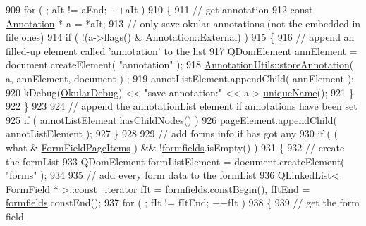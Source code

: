 \begin{DoxyCode}
909         \textcolor{keywordflow}{for} ( ; aIt != aEnd; ++aIt )
910         \{
911             \textcolor{comment}{// get annotation}
912             \textcolor{keyword}{const} \hyperlink{classOkular_1_1Annotation}{Annotation} * a = *aIt;
913             \textcolor{comment}{// only save okular annotations (not the embedded in file ones)}
914             \textcolor{keywordflow}{if} ( !(a->\hyperlink{classOkular_1_1Annotation_a3d6f7ee5057155b90e76c24768880947}{flags}() & \hyperlink{classOkular_1_1Annotation_a8a214541446745761efeda70b3a4302eabe908102c97a725aa1928602f17833c0}{Annotation::External}) )
915             \{
916                 \textcolor{comment}{// append an filled-up element called 'annotation' to the list}
917                 QDomElement annElement = document.createElement( \textcolor{stringliteral}{"annotation"} );
918                 \hyperlink{classOkular_1_1AnnotationUtils_aaf554db9b97842dd6298317dd539bf82}{AnnotationUtils::storeAnnotation}( a, annElement, document )
      ;
919                 annotListElement.appendChild( annElement );
920                 kDebug(\hyperlink{debug__p_8h_af16c6e32a95969dd0605d792ec9807c7}{OkularDebug}) << \textcolor{stringliteral}{"save annotation:"} << a->
      \hyperlink{classOkular_1_1Annotation_a8a86ff8c722014c2296112d0fa703eab}{uniqueName}();
921             \}
922         \}
923 
924         \textcolor{comment}{// append the annotationList element if annotations have been set}
925         \textcolor{keywordflow}{if} ( annotListElement.hasChildNodes() )
926             pageElement.appendChild( annotListElement );
927     \}
928 
929     \textcolor{comment}{// add forms info if has got any}
930     \textcolor{keywordflow}{if} ( ( what & \hyperlink{namespaceOkular_ad8955fd515cc3f63a14cdff6723e6c1bac7554622ca47fc955ea25889b6637d3b}{FormFieldPageItems} ) && !\hyperlink{classOkular_1_1PagePrivate_a398106cf0b0b54b59dd2bbc625092151}{formfields}.isEmpty() )
931     \{
932         \textcolor{comment}{// create the formList}
933         QDomElement formListElement = document.createElement( \textcolor{stringliteral}{"forms"} );
934 
935         \textcolor{comment}{// add every form data to the formList}
936         \hyperlink{classQLinkedList}{QLinkedList< FormField * >::const\_iterator} fIt = 
      \hyperlink{classOkular_1_1PagePrivate_a398106cf0b0b54b59dd2bbc625092151}{formfields}.constBegin(), fItEnd = \hyperlink{classOkular_1_1PagePrivate_a398106cf0b0b54b59dd2bbc625092151}{formfields}.constEnd();
937         \textcolor{keywordflow}{for} ( ; fIt != fItEnd; ++fIt )
938         \{
939             \textcolor{comment}{// get the form field}

\end{DoxyCode}
